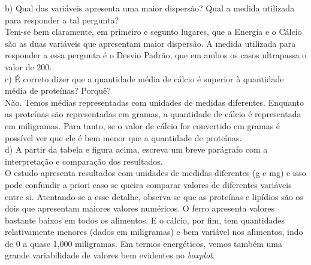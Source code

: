b) Qual das variáveis apresenta uma maior dispersão? Qual a medida utilizada para responder a tal pergunta?
\\

Tem-se bem claramente, em primeiro e segunto lugares, que a Energia e o Cálcio são as duas variáveis que apresentam maior dispersão. A medida utilizada para responder a essa pergunta é o Desvio Padrão, que em ambos os casos ultrapassa o valor de 200.
\\

c) É correto dizer que a quantidade média de cálcio é superior à quantidade média de proteínas? Porquê?
\\

Não. Temos médias representadas com unidades de medidas diferentes. Enquanto as proteínas são representadas em gramas, a quantidade de cálcio é representada em miligramas. Para tanto, se o valor de cálcio for convertido em gramas é possível ver que ele é bem menor que a quantidade de proteínas.
\\

d) A partir da tabela e figura acima, escreva um breve parágrafo com a interpretação e comparação dos resultados.
\\

O estudo apresenta resultados com unidades de medidas diferentes (g e mg) e isso pode confundir a priori caso se queira comparar valores de diferentes variáveis entre si. Atentando-se a esse detalhe, observa-se que as proteínas e lipídios são os dois que apresentam maiores valores numéricos. O ferro apresenta valores bastante baixos em todos os alimentos. E o cálcio, por fim, tem quantidades relativamente menores (dados em miligramas) e bem variável nos alimentos, indo de 0 a quase 1,000 miligramas. Em termos energéticos, vemos também uma grande variabilidade de valores bem evidentes no \textit{boxplot}.
\\